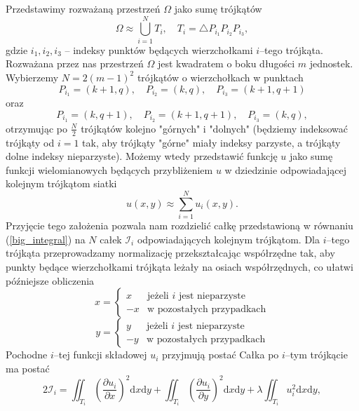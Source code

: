 \documentclass{classrep}
\begin{document}
Przedstawimy rozważaną przestrzeń $\Omega$ jako sumę trójkątów
\begin{equation}
\Omega \approx \bigcup_{i=1}^N T_i, \quad T_i = \triangle P_{i_1} P_{i_2} P_{i_3},
\end{equation}
gdzie $i_1, i_2, i_3$ -- indeksy punktów będących wierzchołkami $i$--tego trójkąta. Rozważana przez nas przestrzeń $\Omega$ jest kwadratem o boku długości $m$ jednostek. Wybierzemy $N = 2(m-1)^2$ trójkątów o wierzchołkach w punktach
\begin{equation}
P_{i_1}=(k+1, q), \quad P_{i_2}=(k, q), \quad P_{i_3}=(k+1, q+1)
\end{equation}
oraz
\begin{equation}
P_{i_1}=(k, q+1), \quad P_{i_2}=(k+1, q+1), \quad P_{i_3}=(k, q),
\end{equation}
otrzymując po $\frac{N}{2}$ trójkątów kolejno "górnych" i "dolnych" (będziemy indeksować trójkąty od $i=1$ tak, aby trójkąty "górne" miały indeksy parzyste, a trójkąty dolne indeksy nieparzyste).
Możemy wtedy przedstawić funkcję $u$ jako sumę funkcji wielomianowych będących przybliżeniem $u$ w dziedzinie odpowiadającej kolejnym trójkątom siatki
\begin{equation}
u(x, y) \approx \sum_{i=1}^N u_i(x, y).
\end{equation}
Przyjęcie tego założenia pozwala nam rozdzielić całkę przedstawioną w równaniu (\ref{big_integral}) na $N$ całek $\mathcal{I}_i$ odpowiadających kolejnym trójkątom. 
Dla $i$--tego trójkąta przeprowadzamy normalizację przekształcając współrzędne tak, aby punkty będące wierzchołkami trójkąta leżały na osiach współrzędnych, co ułatwi późniejsze obliczenia
\begin{equation}
x = 
\begin{cases}
x & \text{jeżeli $i$ jest nieparzyste}\\
-x & \text{w pozostałych przypadkach}
\end{cases}
\end{equation}
\begin{equation}
y = 
\begin{cases}
y & \text{jeżeli $i$ jest nieparzyste}\\
-y & \text{w pozostałych przypadkach}
\end{cases}
\end{equation}
Pochodne $i$--tej funkcji składowej $u_i$ przyjmują postać
Całka po $i$--tym trójkącie ma postać
\begin{equation} \label{other_big_integral}
2\mathcal{I}_i = 
\iint_{T_i} \left(\frac{\partial u_i}{\partial x}\right)^2 \mathrm{d}x\mathrm{d}y + 
\iint_{T_i} \left(\frac{\partial u_i}{\partial y}\right)^2 \mathrm{d}x\mathrm{d}y + 
\lambda \iint_{T_i} u_i^2 \mathrm{d}x\mathrm{d}y,
\end{equation}
\end{document}
